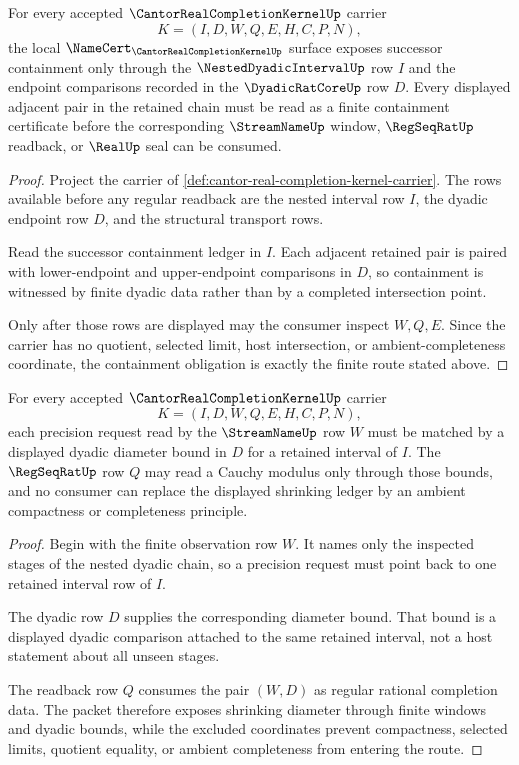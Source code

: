 \begin{theorem}
\label{thm:cantor-real-completion-kernel-nested-containment}
For every accepted $\CantorRealCompletionKernelUp$ carrier
$$
K=(I,D,W,Q,E,H,C,P,N),
$$
the local $\NameCert_{\CantorRealCompletionKernelUp}$ surface exposes successor containment only through the $\NestedDyadicIntervalUp$ row $I$ and the endpoint comparisons recorded in the $\DyadicRatCoreUp$ row $D$. Every displayed adjacent pair in the retained chain must be read as a finite containment certificate before the corresponding $\StreamNameUp$ window, $\RegSeqRatUp$ readback, or $\RealUp$ seal can be consumed.
\end{theorem}
\begin{proof}
Project the carrier of \autoref{def:cantor-real-completion-kernel-carrier}. The rows available before any regular readback are the nested interval row $I$, the dyadic endpoint row $D$, and the structural transport rows.

Read the successor containment ledger in $I$. Each adjacent retained pair is paired with lower-endpoint and upper-endpoint comparisons in $D$, so containment is witnessed by finite dyadic data rather than by a completed intersection point.

Only after those rows are displayed may the consumer inspect $W,Q,E$. Since the carrier has no quotient, selected limit, host intersection, or ambient-completeness coordinate, the containment obligation is exactly the finite route stated above.
\end{proof}

\begin{theorem}
\label{thm:cantor-real-completion-kernel-shrinking-diameter}
For every accepted $\CantorRealCompletionKernelUp$ carrier
$$
K=(I,D,W,Q,E,H,C,P,N),
$$
each precision request read by the $\StreamNameUp$ row $W$ must be matched by a displayed dyadic diameter bound in $D$ for a retained interval of $I$. The $\RegSeqRatUp$ row $Q$ may read a Cauchy modulus only through those bounds, and no consumer can replace the displayed shrinking ledger by an ambient compactness or completeness principle.
\end{theorem}
\begin{proof}
Begin with the finite observation row $W$. It names only the inspected stages of the nested dyadic chain, so a precision request must point back to one retained interval row of $I$.

The dyadic row $D$ supplies the corresponding diameter bound. That bound is a displayed dyadic comparison attached to the same retained interval, not a host statement about all unseen stages.

The readback row $Q$ consumes the pair $(W,D)$ as regular rational completion data. The packet therefore exposes shrinking diameter through finite windows and dyadic bounds, while the excluded coordinates prevent compactness, selected limits, quotient equality, or ambient completeness from entering the route.
\end{proof}

